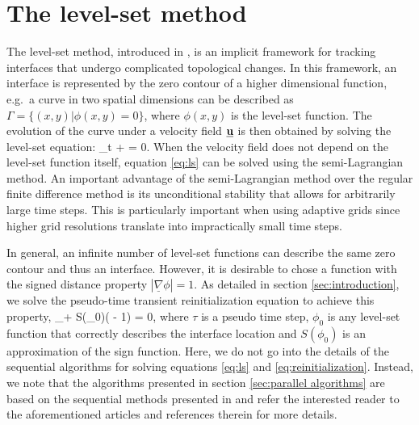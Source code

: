 \section{The level-set method}\label{sec:levelset method}
The level-set method, introduced in \cite{Osher;Sethian:88:Fronts-Propagating-w}, is an implicit framework for tracking interfaces that undergo complicated topological changes. In this framework, an interface is represented by the zero contour of a higher dimensional function, e.g.\ a curve in two spatial dimensions can be described as $\Gamma = \{(x,y) | \phi(x,y) = 0\}$, where $\phi(x,y)$ is the level-set function. The evolution of the curve under a velocity field $\underline{\mathbf{u}}$ is then obtained by solving the level-set equation:
\be
\phi_t + \underline{} \cdot \underline{\nabla} \phi = 0.
\label{eq:ls}
\ee
When the velocity field does not depend on the level-set function itself, equation \eqref{eq:ls} can be solved using the semi-Lagrangian method. An important advantage of the semi-Lagrangian method over the regular finite difference method is its unconditional stability that allows for arbitrarily large time steps. This is particularly important when using adaptive grids since higher grid resolutions translate into impractically small time steps.

In general, an infinite number of level-set functions can describe the same zero contour and thus an interface. However, it is desirable to chose a function with the signed distance property $|\underline{\nabla} \phi| = 1$. As detailed in section \ref{sec:introduction}, we solve the pseudo-time transient reinitialization equation \cite{Sussman;Smereka;Osher:94:A-Level-Set-Approach, Osher;Fedkiw:01:Level-Set-Methods:-A} to achieve this property,
\be
\phi_\tau + S(\phi_0)\left(\lvert \underline{\nabla} \phi \rvert - 1\right) = 0,
\label{eq:reinitialization}
\ee
where $\tau$ is a pseudo time step, $\phi_0$ is any level-set function that correctly describes the interface location and $S(\phi_0)$ is an approximation of the sign function. Here, we do not go into the details of the sequential algorithms for solving equations \eqref{eq:ls} and \eqref{eq:reinitialization}. Instead, we note that the algorithms presented in section \ref{sec:parallel algorithms} are based on the sequential methods presented in \cite{Min;Gibou:07:A-second-order-accur} and refer the interested reader to the aforementioned articles and references therein for more details.